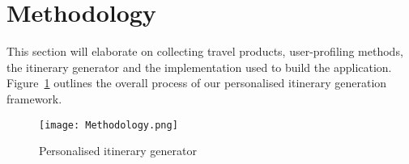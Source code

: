\section{Methodology}

This section will elaborate on collecting travel
products, user-profiling methods, the itinerary generator and the
implementation used to build the application.
Figure~\ref{Methodology} outlines the overall process of our personalised
itinerary generation
framework. 

\begin{figure}[h]
\centering
\texttt{[image: Methodology.png]}
\caption{Personalised itinerary generator}
\label{Methodology}
\end{figure}






